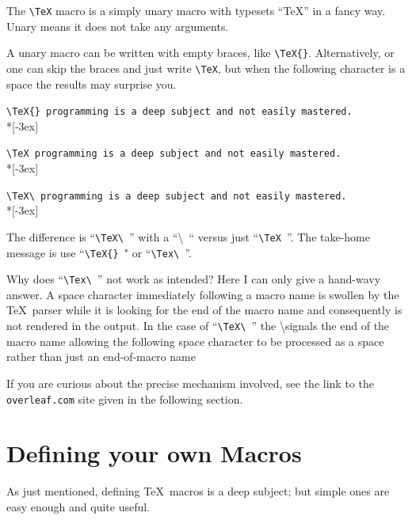 \documentclass{article}
\newcommand*\𝚝[1]{\texttt{#1}}%
\begin{document}
The \verb|\TeX| macro is a simply unary macro with typesets ``TeX'' in a fancy way.
Unary means it does not take any arguments.

A unary macro can be written with empty braces, like \verb|\TeX{}|.
Alternatively, or one can skip the braces and just write \verb|\TeX|,
but when the following character is a space the results may surprise you.

\verb|\TeX{} programming is a deep subject and not easily mastered.|\\*[-3ex]%
\begin{center}\end{center}

\verb|\TeX programming is a deep subject and not easily mastered.|\\*[-3ex]
\begin{center}\end{center}

\verb|\TeX\ programming is a deep subject and not easily mastered.|\\*[-3ex]
\begin{center}\end{center}

The difference is ``\verb|\TeX\ |'' with a ``\backslash\ `` versus just ``\verb|\TeX |''.
The take-home message is use ``\verb|\TeX{} |" or ``\verb|\Tex\ |''.


Why does ``\verb|\Tex\ |'' not work as intended?
Here I can only give a hand-wavy answer.
A space character immediately following a macro name is swollen by the \TeX\ parser while it is looking for the end of the macro name
and consequently is not rendered in the output.
In the case of ``\verb|\TeX\ |'' the \backslash signals the end of the macro name allowing
the following space character to be processed as a space rather than just an end-of-macro name

If you are curious about the precise mechanism involved, see the link to the \𝚝{overleaf.com} site
given in the following section.


\section*{Defining your own Macros}
As just mentioned, defining \TeX\ macros is a deep subject; but simple ones are easy enough and quite useful.
\end{document}
